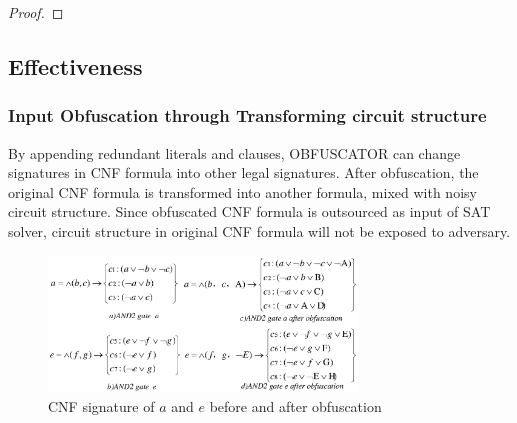 \documentclass[conference,compsocconf]{IEEEtran}
\begin{document}
\begin{proof}
% 
% 
% 
\end{proof}

\subsection{Effectiveness}
\subsubsection{Input Obfuscation through Transforming circuit structure}

By appending redundant literals and clauses,
OBFUSCATOR can change signatures in CNF formula into other legal signatures.
After obfuscation, the original CNF formula is transformed into another formula,
mixed with noisy circuit structure.
Since obfuscated CNF formula is outsourced as input of SAT solver,
circuit structure in original CNF formula will not  be exposed to adversary.


\begin{figure}[b]
\centering
\includegraphics[width=8.2cm]{AND2-2}
\caption{CNF signature of $a$ and $e$ before and after obfuscation}
\label{fig_beforeafter}
\end{figure}
\end{document}
